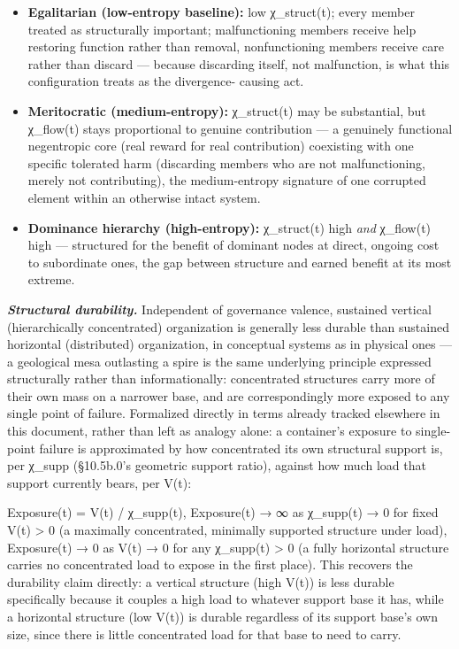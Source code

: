 \documentclass[
]{article}
\begin{document}
\begin{itemize}
\item
  \textbf{Egalitarian (low-entropy baseline):} low χ\_struct(t); every
  member treated as structurally important; malfunctioning members
  receive help restoring function rather than removal, nonfunctioning
  members receive care rather than discard --- because discarding
  itself, not malfunction, is what this configuration treats as the
  divergence- causing act.
\item
  \textbf{Meritocratic (medium-entropy):} χ\_struct(t) may be
  substantial, but χ\_flow(t) stays proportional to genuine contribution
  --- a genuinely functional negentropic core (real reward for real
  contribution) coexisting with one specific tolerated harm (discarding
  members who are not malfunctioning, merely not contributing), the
  medium-entropy signature of one corrupted element within an otherwise
  intact system.
\item
  \textbf{Dominance hierarchy (high-entropy):} χ\_struct(t) high
  \emph{and} χ\_flow(t) high --- structured for the benefit of dominant
  nodes at direct, ongoing cost to subordinate ones, the gap between
  structure and earned benefit at its most extreme.
\end{itemize}

\emph{\textbf{Structural durability.}} Independent of governance
valence, sustained vertical (hierarchically concentrated) organization
is generally less durable than sustained horizontal (distributed)
organization, in conceptual systems as in physical ones --- a geological
mesa outlasting a spire is the same underlying principle expressed
structurally rather than informationally: concentrated structures carry
more of their own mass on a narrower base, and are correspondingly more
exposed to any single point of failure. Formalized directly in terms
already tracked elsewhere in this document, rather than left as analogy
alone: a container's exposure to single-point failure is approximated by
how concentrated its own structural support is, per χ\_supp (§10.5b.0's
geometric support ratio), against how much load that support currently
bears, per V(t):

Exposure(t) = V(t) / χ\_supp(t), Exposure(t) → ∞ as χ\_supp(t) → 0 for
fixed V(t) \textgreater{} 0 (a maximally concentrated, minimally
supported structure under load), Exposure(t) → 0 as V(t) → 0 for any
χ\_supp(t) \textgreater{} 0 (a fully horizontal structure carries no
concentrated load to expose in the first place). This recovers the
durability claim directly: a vertical structure (high V(t)) is less
durable specifically because it couples a high load to whatever support
base it has, while a horizontal structure (low V(t)) is durable
regardless of its support base's own size, since there is little
concentrated load for that base to need to carry.
\end{document}
